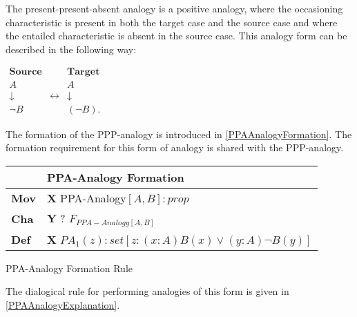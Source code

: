 				The present-present-absent analogy is a positive analogy, where the occasioning characteristic is present in both the target case and the source case and where the entailed characteristic is absent in the source case. This analogy form can be described in the following way:
                	\begin{table}[H]
                	\centering	
                	$
                    \begin{array}{ccc}
                    	\textbf{Source} &                 & \textbf{Target} \\
                    	A               & & A               \\
                    	\downarrow      & \leftrightarrow & \downarrow      \\
                    	\neg B          & & (\neg B).
                    \end{array}
               	 	$
               	 	\end{table}
               	 The formation of the PPP-analogy is introduced in \autoref{PPAAnalogyFormation}. The formation requirement for this form of analogy is shared with the PPP-analogy. 
               	 	
               		\begin{Scheme}[H]\footnotesize
               		\centering
               		\begin{tabular}{l l}\footnotesize
               			                   & \textbf{PPA-Analogy Formation} \\ \toprule
               			\textbf{Mov}      & \textbf{X} PPA-Analogy$[A,B] : prop$ \\ \midrule
               			\textbf{Cha} & \textbf{Y} ? $F_{PPA-Analogy[A,B]}$ \\ \midrule
               			\textbf{Def}   & \textbf{X} $PA_1(z) : set [z : (x : A)B(x) \lor (y : A) \neg B(y)]$ \\ \bottomrule
               		\end{tabular}
               		\caption{PPA-Analogy Formation Rule}
               		\label{PPAAnalogyFormation}
					\end{Scheme}               	 
               	 	               	 	
               	 \noindent The dialogical rule for performing analogies of this form is given in \autoref{PPAAnalogyExplanation}.
					
